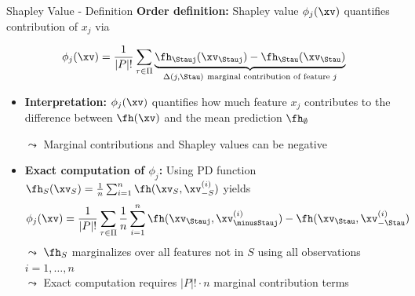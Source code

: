 \documentclass[11pt,compress,t,notes=noshow, aspectratio=169, xcolor=table]{beamer}
\begin{document}
\begin{frame}{Shapley Value - Definition  }
  \textbf{Order definition:} Shapley value $\phi_j(\xv)$ quantifies contribution of $x_j$ via

     $$ \phi_j(\xv)  = \frac{1}{|P|!} \sum_{\tau \in \Pi} \underbrace{\fh_{\Stauj}(\xv_{\Stauj}) - \fh_{\Stau}(\xv_{\Stau})}_{\Delta(j, \Stau)~\text{marginal contribution of feature $j$}} $$ %
     
     
\begin{itemize}
  \item \textbf{Interpretation:}  $\phi_j(\xv)$ quantifies how much feature $x_j$ contributes to the difference between $\fh(\xv)$ and the mean prediction $\fh_\emptyset$

  $\leadsto$ Marginal contributions and Shapley values can be negative
   \item \textbf{Exact computation of $\phi_j$:} Using PD function 
   $\fh_{S}(\xv_S) = \frac{1}{n} \sum_{i=1}^n \fh(\xv_S, \xv_{-S}^{(i)})$ 
   yields
    $$ \phi_j(\xv) = \frac{1}{|P|!} \sum_{\tau \in \Pi} \frac{1}{n} \sum_{i = 1}^n
   \fh(\xv_{\Stauj}, \xv_{\minusStauj}^{(i)}) - \fh(\xv_{\Stau}, \xv_{- \Stau}^{(i)})
   $$
   $\leadsto$ $\fh_S$ marginalizes over all features not in $S$ using all observations $i = 1, \ldots, n$\\
   $\leadsto$ Exact computation requires $|P|! \cdot n$ marginal contribution terms
   
\end{itemize}
\lz

\end{frame}
\end{document}
